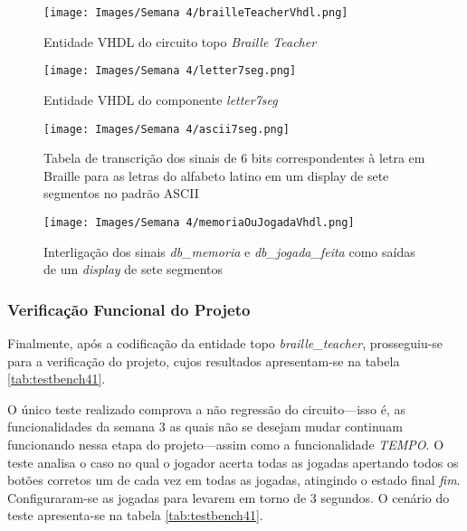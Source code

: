 \documentclass[amsmath,amssymb,floatfix]{report}
\begin{document}
\begin{figure}[H]
    \centering
    \texttt{[image: Images/Semana 4/brailleTeacherVhdl.png]}
    \caption{Entidade VHDL do circuito topo \textit{Braille Teacher}}
    \label{fig:brailleTeacherVhdl4}
\end{figure}

\begin{figure}[H]
    \centering
    \texttt{[image: Images/Semana 4/letter7seg.png]}
    \caption{Entidade VHDL do componente \textit{letter7seg}}
    \label{fig:letter7seg}
\end{figure}

\begin{figure}[H]
    \centering
    \texttt{[image: Images/Semana 4/ascii7seg.png]}
    \caption{Tabela de transcrição dos sinais de 6 bits correspondentes à letra em Braille para as letras do alfabeto latino em um display de sete segmentos no padrão ASCII}
    \label{fig:ascii7seg}
\end{figure}

\begin{figure}[H]
    \centering
    \texttt{[image: Images/Semana 4/memoriaOuJogadaVhdl.png]}
    \caption{Interligação dos sinais \textit{db\_memoria} e \textit{db\_jogada\_feita} como saídas de um \textit{display} de sete segmentos}
    \label{fig:memoriaOuJogadaVhdl}
\end{figure}

\subsubsection{Verificação Funcional do Projeto}
\label{subsubsec:tbVhdl4}

Finalmente, após a codificação da entidade topo \textit{braille\_teacher}, prosseguiu-se para a verificação do projeto, cujos resultados apresentam-se na tabela \ref{tab:testbench41}.

O único teste realizado comprova a não regressão do circuito---isso é, as funcionalidades da semana 3 as quais não se desejam mudar continuam funcionando nessa etapa do projeto---assim como a funcionalidade \textit{TEMPO}. O teste analisa o caso no qual o jogador acerta todas as jogadas apertando todos os botões corretos um de cada vez em todas as jogadas, atingindo o estado final \textit{fim}. Configuraram-se as jogadas para levarem em torno de 3 segundos. O cenário do teste apresenta-se na tabela \ref{tab:testbench41}.
\end{document}

